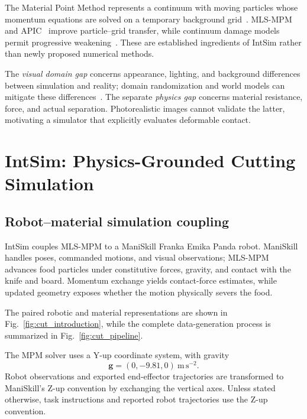 The Material Point Method represents a continuum with moving particles whose momentum equations are solved on a temporary background grid~\cite{sulsky1994particle,2013-mpm}. MLS-MPM~\cite{2018-MLSMPM} and APIC~\cite{jiang2017angular} improve particle--grid transfer, while continuum damage models permit progressive weakening~\cite{2019-cdmpm,10.1145/3340259}. These are established ingredients of IntSim rather than newly proposed numerical methods.

The \emph{visual domain gap} concerns appearance, lighting, and background differences between simulation and reality; domain randomization and world models can mitigate these differences~\cite{tobin2017domainrandomizationtransferringdeep,nvidia2025cosmosworldfoundationmodel}. The separate \emph{physics gap} concerns material resistance, force, and actual separation. Photorealistic images cannot validate the latter, motivating a simulator that explicitly evaluates deformable contact.

\FloatBarrier

\section{IntSim: Physics-Grounded Cutting Simulation}
\label{sec:cut_intsim}

\subsection{Robot--material simulation coupling}
\label{subsec:cut_coupling}

IntSim couples MLS-MPM to a ManiSkill Franka Emika Panda robot. ManiSkill handles poses, commanded motions, and visual observations; MLS-MPM advances food particles under constitutive forces, gravity, and contact with the knife and board. Momentum exchange yields contact-force estimates, while updated geometry exposes whether the motion physically severs the food.

The paired robotic and material representations are shown in Fig.~\ref{fig:cut_introduction}, while the complete data-generation process is summarized in Fig.~\ref{fig:cut_pipeline}.

The MPM solver uses a Y-up coordinate system, with gravity
\begin{equation}
  \mathbf{g}=(0,-9.81,0)\ \mathrm{m\,s^{-2}}.
\end{equation}
Robot observations and exported end-effector trajectories are transformed to ManiSkill's Z-up convention by exchanging the vertical axes. Unless stated otherwise, task instructions and reported robot trajectories use the Z-up convention.

